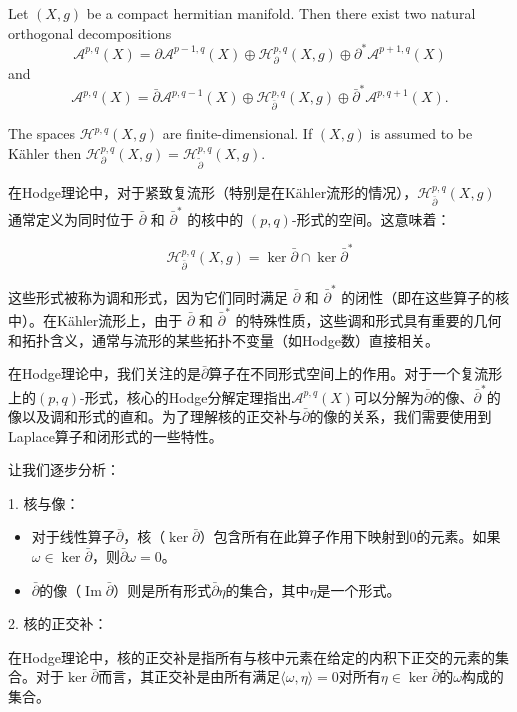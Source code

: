\documentclass[lang=cn,zihao=-4,a4paper,fontset=none]{beautybook}
\begin{document}
\begin{theorem}
Let $(X, g)$ be a compact hermitian manifold. Then there exist two natural orthogonal decompositions
$$
\mathcal{A}^{p, q}(X)=\partial \mathcal{A}^{p-1, q}(X) \oplus \mathcal{H}_{\partial}^{p, q}(X, g) \oplus \partial^* \mathcal{A}^{p+1, q}(X)
$$
and
$$
\mathcal{A}^{p, q}(X)=\bar{\partial} \mathcal{A}^{p, q-1}(X) \oplus \mathcal{H}_{\bar{\partial}}^{p, q}(X, g) \oplus \bar{\partial}^* \mathcal{A}^{p, q+1}(X) .
$$

The spaces $\mathcal{H}^{p, q}(X, g)$ are finite-dimensional. If $(X, g)$ is assumed to be Kähler then $\mathcal{H}_{\partial}^{p, q}(X, g)=\mathcal{H}_{\tilde{\partial}}^{p, q}(X, g)$.
\end{theorem}
在Hodge理论中，对于紧致复流形（特别是在Kähler流形的情况），$\mathcal{H}_{\bar{\partial}}^{p, q}(X, g)$ 通常定义为同时位于 $\bar{\partial}$ 和 $\bar{\partial}^*$ 的核中的 $(p, q)$-形式的空间。这意味着：

$$
\mathcal{H}_{\bar{\partial}}^{p, q}(X, g) = \ker \bar{\partial} \cap \ker \bar{\partial}^*
$$

这些形式被称为调和形式，因为它们同时满足 $\bar{\partial}$ 和 $\bar{\partial}^*$ 的闭性（即在这些算子的核中）。在Kähler流形上，由于 $\bar{\partial}$ 和 $\bar{\partial}^*$ 的特殊性质，这些调和形式具有重要的几何和拓扑含义，通常与流形的某些拓扑不变量（如Hodge数）直接相关。

在Hodge理论中，我们关注的是$\bar{\partial}$算子在不同形式空间上的作用。对于一个复流形上的$(p,q)$-形式，核心的Hodge分解定理指出$\mathcal{A}^{p, q}(X)$可以分解为$\bar{\partial}$的像、$\bar{\partial}^*$的像以及调和形式的直和。为了理解核的正交补与$\bar{\partial}$的像的关系，我们需要使用到Laplace算子和闭形式的一些特性。

让我们逐步分析：

1. 核与像：
\begin{itemize}
   \item 对于线性算子$\bar{\partial}$，核（$\ker \bar{\partial}$）包含所有在此算子作用下映射到0的元素。如果$\omega \in \ker \bar{\partial}$，则$\bar{\partial} \omega = 0$。
   \item $\bar{\partial}$的像（$\operatorname{Im} \bar{\partial}$）则是所有形式$\bar{\partial} \eta$的集合，其中$\eta$是一个形式。
\end{itemize}

2. 核的正交补：

   在Hodge理论中，核的正交补是指所有与核中元素在给定的内积下正交的元素的集合。对于$\ker \bar{\partial}$而言，其正交补是由所有满足$\langle \omega, \eta \rangle = 0$对所有$\eta \in \ker \bar{\partial}$的$\omega$构成的集合。
\end{document}
